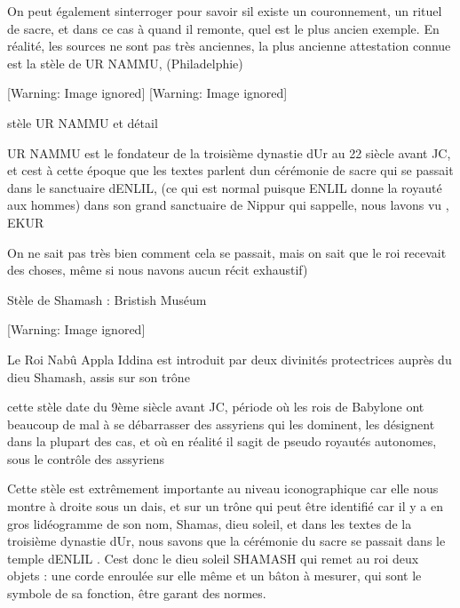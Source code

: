 \documentclass{article}
\begin{document}
On peut également s{\textquotesingle}interroger pour savoir
s{\textquotesingle}il existe un couronnement, un rituel de sacre, et
dans ce cas à quand il remonte, quel est le plus ancien exemple.  En
réalité, les sources ne sont pas très anciennes, la plus ancienne
attestation connue est la stèle de UR NAMMU, (Philadelphie)

  [Warning: Image ignored] %
   [Warning: Image ignored] %
 

stèle UR NAMMU et détail

UR NAMMU est le fondateur de la troisième dynastie d{\textquotesingle}Ur
au 22 siècle avant JC, et c{\textquotesingle}est à cette époque que les
textes parlent d{\textquotesingle}un cérémonie de sacre qui se passait
dans le sanctuaire d{\textquotesingle}ENLIL, (ce qui est normal puisque
ENLIL donne la royauté aux hommes) dans son grand sanctuaire de Nippur
qui s{\textquotesingle}appelle, nous l{\textquotesingle}avons vu , EKUR

On ne sait pas très bien comment cela se passait, mais on sait que le
roi recevait des choses, même si nous n{\textquotesingle}avons aucun
récit exhaustif)

Stèle de Shamash : Bristish Muséum

  [Warning: Image ignored] %
 

Le Roi Nabû Appla Iddina est introduit par deux divinités protectrices
auprès du dieu Shamash, assis sur son trône

cette stèle date du 9ème siècle avant JC, période où les rois de
Babylone ont beaucoup de mal à se débarrasser des assyriens qui les
dominent, les désignent dans la plupart des cas, et où en réalité il
s{\textquotesingle}agit de pseudo royautés autonomes, sous le contrôle
des assyriens

Cette stèle est extrêmement importante au niveau iconographique car elle
nous montre à droite sous un dais, et sur un trône qui peut être
identifié car il y a en gros l{\textquotesingle}idéogramme de son nom,
Shamas, dieu soleil, et dans les textes de la troisième dynastie
d{\textquotesingle}Ur, nous savons que la cérémonie du sacre se passait
dans le temple d{\textquotesingle}ENLIL . C{\textquotesingle}est donc
le dieu soleil SHAMASH qui remet au roi deux objets : une corde
enroulée sur elle même et un bâton à mesurer, qui sont le symbole de sa
fonction, être garant des normes.
\end{document}
